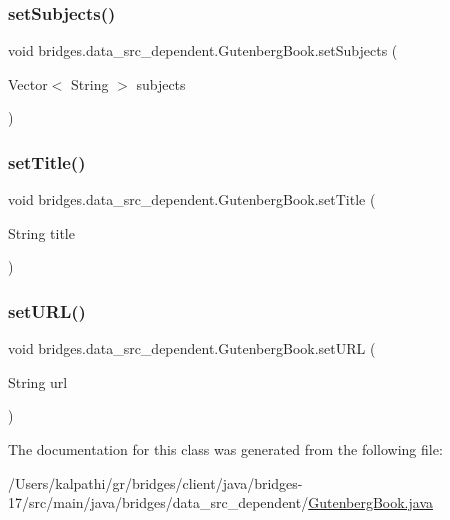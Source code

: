 \subsubsection{\texorpdfstring{set\+Subjects()}{setSubjects()}}
{\footnotesize\ttfamily void bridges.\+data\+\_\+src\+\_\+dependent.\+Gutenberg\+Book.\+set\+Subjects (\begin{DoxyParamCaption}\item[{Vector$<$ String $>$}]{subjects }\end{DoxyParamCaption})}

\mbox{\label{classbridges_1_1data__src__dependent_1_1_gutenberg_book_a1f4b11121296e76e4d5afc86157b52d4}} 
\subsubsection{\texorpdfstring{set\+Title()}{setTitle()}}
{\footnotesize\ttfamily void bridges.\+data\+\_\+src\+\_\+dependent.\+Gutenberg\+Book.\+set\+Title (\begin{DoxyParamCaption}\item[{String}]{title }\end{DoxyParamCaption})}

\mbox{\label{classbridges_1_1data__src__dependent_1_1_gutenberg_book_a9069f9c6835df30ccabf179158b9aa18}} 
\subsubsection{\texorpdfstring{set\+U\+R\+L()}{setURL()}}
{\footnotesize\ttfamily void bridges.\+data\+\_\+src\+\_\+dependent.\+Gutenberg\+Book.\+set\+U\+RL (\begin{DoxyParamCaption}\item[{String}]{url }\end{DoxyParamCaption})}



The documentation for this class was generated from the following file\+:\begin{DoxyCompactItemize}
\item 
/\+Users/kalpathi/gr/bridges/client/java/bridges-\/17/src/main/java/bridges/data\+\_\+src\+\_\+dependent/\mbox{\hyperlink{_gutenberg_book_8java}{Gutenberg\+Book.\+java}}\end{DoxyCompactItemize}
